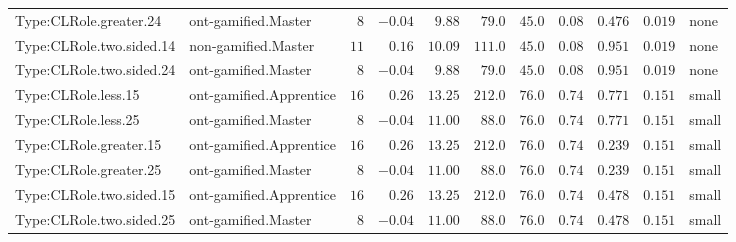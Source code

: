\documentclass[6pt,a4paper]{article}
\begin{document}
{\begin{longtable}{llrrrrrrrrl}
Type:CLRole.greater.24&ont-gamified.Master&$ 8$&$-0.04$&$ 9.88$&$ 79.0$&$ 45.0$&$ 0.08$&$0.476$&$0.019$&none\tabularnewline
Type:CLRole.two.sided.14&non-gamified.Master&$11$&$ 0.16$&$10.09$&$111.0$&$ 45.0$&$ 0.08$&$0.951$&$0.019$&none\tabularnewline
Type:CLRole.two.sided.24&ont-gamified.Master&$ 8$&$-0.04$&$ 9.88$&$ 79.0$&$ 45.0$&$ 0.08$&$0.951$&$0.019$&none\tabularnewline
Type:CLRole.less.15&ont-gamified.Apprentice&$16$&$ 0.26$&$13.25$&$212.0$&$ 76.0$&$ 0.74$&$0.771$&$0.151$&small\tabularnewline
Type:CLRole.less.25&ont-gamified.Master&$ 8$&$-0.04$&$11.00$&$ 88.0$&$ 76.0$&$ 0.74$&$0.771$&$0.151$&small\tabularnewline
Type:CLRole.greater.15&ont-gamified.Apprentice&$16$&$ 0.26$&$13.25$&$212.0$&$ 76.0$&$ 0.74$&$0.239$&$0.151$&small\tabularnewline
Type:CLRole.greater.25&ont-gamified.Master&$ 8$&$-0.04$&$11.00$&$ 88.0$&$ 76.0$&$ 0.74$&$0.239$&$0.151$&small\tabularnewline
\newpage
Type:CLRole.two.sided.15&ont-gamified.Apprentice&$16$&$ 0.26$&$13.25$&$212.0$&$ 76.0$&$ 0.74$&$0.478$&$0.151$&small\tabularnewline
Type:CLRole.two.sided.25&ont-gamified.Master&$ 8$&$-0.04$&$11.00$&$ 88.0$&$ 76.0$&$ 0.74$&$0.478$&$0.151$&small\tabularnewline
\hline
\end{longtable}}
\end{document}
